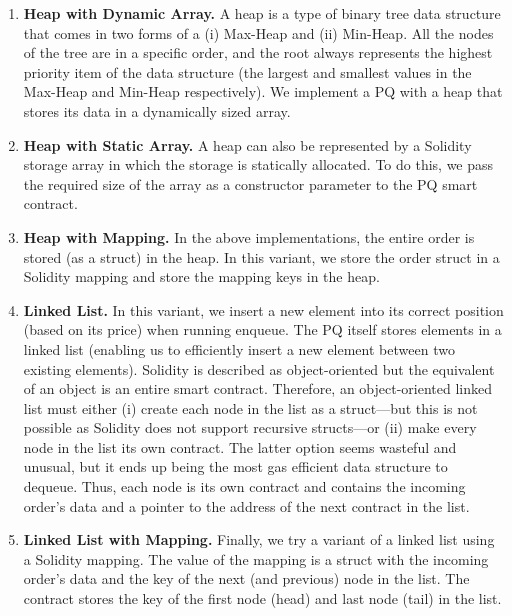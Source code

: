 \begin{enumerate}

\item \textbf{Heap with Dynamic Array.} A heap is a type of binary tree data structure that comes in two forms of a (i) Max-Heap and (ii) Min-Heap. All the nodes of the tree are in a specific order, and the root always represents the highest priority item of the data structure (the largest and smallest values in the Max-Heap and Min-Heap respectively). We implement a PQ with a heap that stores its data in a dynamically sized array. 

\item \textbf{Heap with Static Array.} A heap can also be represented by a Solidity storage array in which the storage is statically allocated. To do this, we pass the required size of the array as a constructor parameter to the PQ smart contract. 

\item \textbf{Heap with Mapping.} In the above implementations, the entire order is stored (as a struct) in the heap. In this variant, we store the order struct in a Solidity mapping and store the mapping keys in the heap.  

\item \textbf{Linked List.} In this variant, we insert a new element into its correct position (based on its price) when running enqueue. The PQ itself stores elements in a linked list (enabling us to efficiently insert a new element between two existing elements). Solidity is described as object-oriented but the equivalent of an object is an entire smart contract. Therefore, an object-oriented linked list must either (i) create each node in the list as a struct---but this is not possible as Solidity does not support recursive structs---or (ii) make every node in the list its own contract. The latter option seems wasteful and unusual, but it ends up being the most gas efficient data structure to dequeue. Thus, each node is its own contract and contains the incoming order's data and a pointer to the address of the next contract in the list.

\item \textbf{Linked List with Mapping.} Finally, we try a variant of a linked list using a Solidity mapping. The value of the mapping is a struct with the incoming order's data and the key of the next (and previous) node in the list. The contract stores the key of the first node (head) and last node (tail) in the list. 

\end{enumerate}

